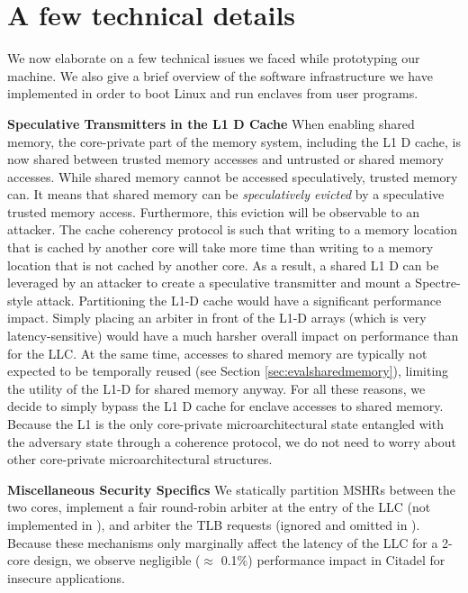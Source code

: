 \section{A few technical details}
We now elaborate on a few technical issues we faced while prototyping our machine.
We also give a brief overview of the software infrastructure we have implemented in order to boot Linux and run enclaves from user programs.

\noindent\textbf{Speculative Transmitters in the L1 D Cache}
\label{sec:l1bypass}
When enabling shared memory, the core-private part of the memory system, including the L1 D cache, is now shared between trusted memory accesses and untrusted or shared memory accesses.
While shared memory cannot be accessed speculatively, trusted memory can.
It means that shared memory can be \emph{speculatively evicted} by a speculative trusted memory access.
Furthermore, this eviction will be observable to an attacker.
The cache coherency protocol is such that writing to a memory location that is cached by another core will take more time than writing to a memory location that is not cached by another core.
As a result, a shared L1 D can be leveraged by an attacker to create a speculative transmitter and mount a Spectre-style attack.
Partitioning the L1-D cache would have a significant performance impact.
Simply placing an arbiter in front of the L1-D arrays (which is very latency-sensitive) would have a much harsher overall impact on performance than for the LLC.
At the same time, accesses to shared memory are typically not expected to be temporally reused (see Section \ref{sec:evalsharedmemory}), limiting the utility of the L1-D for shared memory anyway.
For all these reasons, we decide to simply bypass the L1 D cache for enclave accesses to shared memory.
Because the L1 is the only core-private microarchitectural state entangled with the adversary state through a coherence protocol, we do not need to worry about other core-private microarchitectural structures.

\noindent\textbf{Miscellaneous Security Specifics}
\label{sec:miscellaneous}
We statically partition MSHRs between the two cores, implement a fair round-robin arbiter at the entry of the LLC (not implemented in \cite{bourgeat2019mi6}), and arbiter the TLB requests (ignored and omitted in \cite{bourgeat2019mi6}).
Because these mechanisms only marginally affect the latency of the LLC for a 2-core design, we observe negligible ($\approx$ 0.1\%) performance impact in Citadel for insecure applications.


